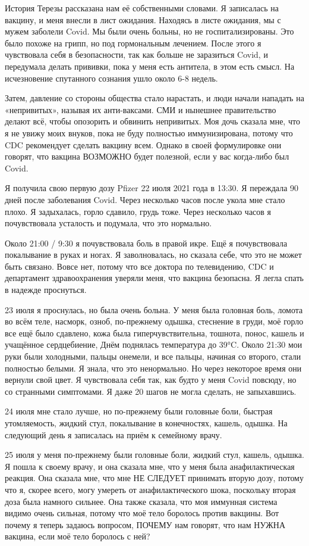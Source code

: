 История Терезы рассказана нам её собственными словами. Я записалась на вакцину,
и меня внесли в лист ожидания. Находясь в листе ожидания, мы с мужем заболели
Covid. Мы были очень больны, но не госпитализированы. Это было похоже на грипп,
но под гормональным лечением. После этого я чувствовала себя в безопасности, так
как больше не заразиться Covid, и передумала делать прививки, пока у меня есть
антитела, в этом есть смысл. На исчезновение спутанного сознания ушло около 6-8
недель.

Затем, давление со стороны общества стало нарастать, и люди начали нападать на
«непривитых», называя их анти-ваксами. СМИ и нынешнее правительство делают всё,
чтобы опозорить и обвинить непривитых. Моя дочь сказала мне, что я не увижу моих
внуков, пока не буду полностью иммунизирована, потому что CDC рекомендует
сделать вакцину всем. Однако в своей формулировке они говорят, что вакцина
ВОЗМОЖНО будет полезной, если у вас когда-либо был Covid.

Я получила свою первую дозу Pfizer 22 июля 2021 года в 13:30. Я переждала 90
дней после заболевания Covid. Через несколько часов после укола мне стало
плохо. Я задыхалась, горло сдавило, грудь тоже. Через несколько часов я
почувствовала усталость и подумала, что это нормально.

Около 21:00 / 9:30 я почувствовала боль в правой икре. Ещё я почувствовала
покалывание в руках и ногах. Я заволновалась, но сказала себе, что это не может
быть связано. Вовсе нет, потому что все доктора по телевидению, CDC и
департамент здравоохранения уверяли меня, что вакцина безопасна. Я легла спать в
надежде проснуться.

23 июля я проснулась, но была очень больна. У меня была головная боль, ломота во
всём теле, насморк, озноб, по-прежнему одышка, стеснение в груди, моё горло все
ещё было сдавлено, кожа была гиперчувствительна, тошнота, понос, кашель и
учащённое сердцебиение, Днём поднялась температура до 39°C. Около 21:30 мои руки
были холодными, пальцы онемели, и все пальцы, начиная со второго, стали
полностью белыми. Я знала, что это ненормально. Но через некоторое время они
вернули свой цвет. Я чувствовала себя так, как будто у меня Covid повсюду, но со
странными симптомами. Я даже 20 шагов не могла сделать, не запыхавшись.

24 июля мне стало лучше, но по-прежнему были головные боли, быстрая
утомляемость, жидкий стул, покалывание в конечностях, кашель, одышка. На
следующий день я записалась на приём к семейному врачу.

25 июля у меня по-прежнему были головные боли, жидкий стул, кашель, одышка. Я
пошла к своему врачу, и она сказала мне, что у меня была анафилактическая
реакция. Она сказала мне, что мне НЕ СЛЕДУЕТ принимать вторую дозу, потому что
я, скорее всего, могу умереть от анафилактического шока, поскольку вторая доза
была намного сильнее. Она также сказала, что моя иммунная система видимо очень
сильная, потому что моё тело боролось против вакцины. Вот почему я теперь
задаюсь вопросом, ПОЧЕМУ нам говорят, что нам НУЖНА вакцина, если моё тело
боролось с ней?

